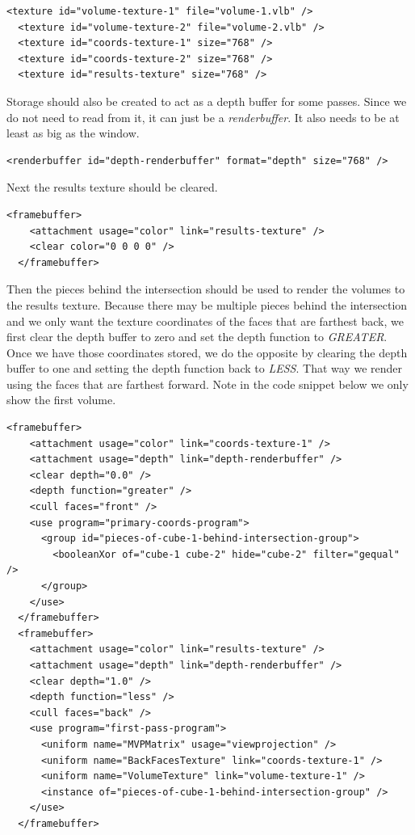 \documentclass{article}
\begin{document}
\begin{Verbatim}[fontsize=\small]
  <texture id="volume-texture-1" file="volume-1.vlb" />
  <texture id="volume-texture-2" file="volume-2.vlb" />
  <texture id="coords-texture-1" size="768" />
  <texture id="coords-texture-2" size="768" />
  <texture id="results-texture" size="768" />
\end{Verbatim}

Storage should also be created to act as a depth buffer for some passes.  Since
we do not need to read from it, it can just be a \emph{renderbuffer}.  It also
needs to be at least as big as the window.

\begin{Verbatim}[fontsize=\small]
  <renderbuffer id="depth-renderbuffer" format="depth" size="768" />
\end{Verbatim}

Next the results texture should be cleared.

\begin{Verbatim}[fontsize=\small]
  <framebuffer>
    <attachment usage="color" link="results-texture" />
    <clear color="0 0 0 0" />
  </framebuffer>
\end{Verbatim}

Then the pieces behind the intersection should be used to render the volumes to
the results texture.  Because there may be multiple pieces behind the
intersection and we only want the texture coordinates of the faces that are
farthest back, we first clear the depth buffer to zero and set the depth
function to \emph{GREATER}.  Once we have those coordinates stored, we do the
opposite by clearing the depth buffer to one and setting the depth function back
to \emph{LESS}.  That way we render using the faces that are farthest forward.
Note in the code snippet below we only show the first volume.

\begin{Verbatim}[fontsize=\small]
  <framebuffer>
    <attachment usage="color" link="coords-texture-1" />
    <attachment usage="depth" link="depth-renderbuffer" />
    <clear depth="0.0" />
    <depth function="greater" />
    <cull faces="front" />
    <use program="primary-coords-program">
      <group id="pieces-of-cube-1-behind-intersection-group">
        <booleanXor of="cube-1 cube-2" hide="cube-2" filter="gequal" />
      </group>
    </use>
  </framebuffer>
  <framebuffer>
    <attachment usage="color" link="results-texture" />
    <attachment usage="depth" link="depth-renderbuffer" />
    <clear depth="1.0" />
    <depth function="less" />
    <cull faces="back" />
    <use program="first-pass-program">
      <uniform name="MVPMatrix" usage="viewprojection" />
      <uniform name="BackFacesTexture" link="coords-texture-1" />
      <uniform name="VolumeTexture" link="volume-texture-1" />
      <instance of="pieces-of-cube-1-behind-intersection-group" />
    </use>
  </framebuffer>
\end{Verbatim}
\end{document}
